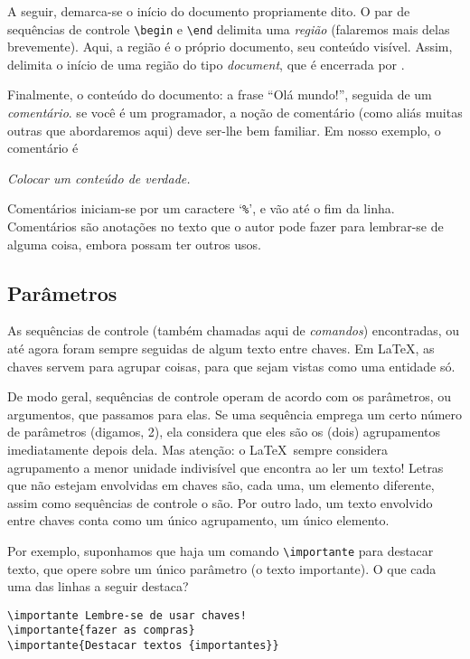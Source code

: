A seguir, demarca-se o início do documento propriamente dito. O par de
sequências de controle \verb!\begin! e \verb!\end! delimita uma
\emph{região} (falaremos mais delas brevemente). Aqui, a região é o
próprio documento, seu conteúdo visível. Assim,
\verb!! delimita o início de uma região do tipo
\emph{document}, que é encerrada por \verb!!.

Finalmente, o conteúdo do documento: a frase ``Olá mundo!'', seguida
de um \emph{comentário}. se você é um programador, a noção de
comentário (como aliás muitas outras que abordaremos aqui)  deve
ser-lhe bem familiar. Em nosso exemplo, o comentário é 

\begin{center}
  \it Colocar um conteúdo de verdade.
\end{center}

Comentários iniciam-se por um caractere `\verb.%.', e vão até o fim da
linha. Comentários são anotações no texto que o autor pode fazer para
lembrar-se de alguma coisa, embora possam ter outros usos.

\subsection{Parâmetros}

As sequências de controle (também chamadas aqui de
\emph{comandos}) encontradas, ou  até agora foram
sempre seguidas de algum texto entre chaves. Em \LaTeX, as chaves
servem para agrupar coisas, para que sejam vistas como uma entidade
só. 

De modo geral, sequências de controle operam de acordo com os
parâmetros, ou argumentos, que passamos para elas. Se uma sequência
emprega um certo número de parâmetros (digamos, 2), ela considera que
eles são os (dois) agrupamentos imediatamente depois dela. Mas
atenção: o \LaTeX\ sempre considera agrupamento a menor unidade indivisível
que encontra ao ler um texto! Letras que não estejam  envolvidas em
chaves são, cada uma, um elemento diferente, assim como sequências de
controle o são. Por outro lado, um texto envolvido entre chaves conta
como um único agrupamento, um único elemento.

Por exemplo, suponhamos que haja um comando \verb!\importante! para
destacar texto, que opere sobre um único parâmetro (o texto
importante). O que cada uma das linhas a seguir destaca?

\begin{footnotesize}
\begin{verbatim}
\importante Lembre-se de usar chaves!
\importante{fazer as compras}
\importante{Destacar textos {importantes}}
\end{verbatim}
\end{footnotesize}

